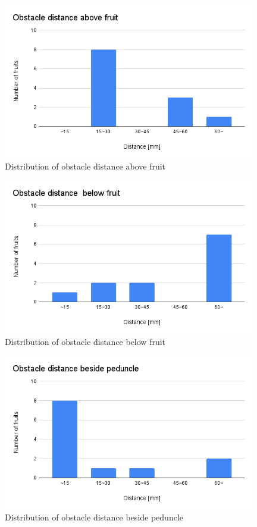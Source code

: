 \vspace{5mm}
\begin{figure}[H]
  \centering
  \includegraphics[width=110mm]{images/png/resultabovef.png}
  \caption{Distribution of obstacle distance above fruit}
  \label{Fig:resultabovef}
\end{figure}

\vspace{5mm}
\begin{figure}[H]
  \centering
  \includegraphics[width=110mm]{images/png/resultbelowf.png}
  \caption{Distribution of obstacle distance below fruit}
  \label{Fig:resultbelowf}
\end{figure}

\vspace{5mm}
\begin{figure}[H]
  \centering
  \includegraphics[width=110mm]{images/png/resultbesidep.png}
  \caption{Distribution of obstacle distance beside peduncle}
  \label{Fig:resultbesidep}
\end{figure}

